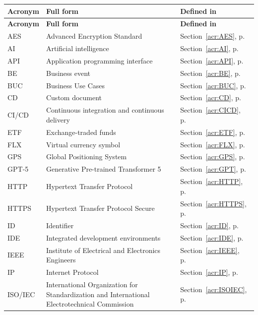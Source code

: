 \documentclass[12pt]{article}
\begin{document}
\small
\begin{xltabular}{\textwidth}{|p{1.9cm}|X|p{3.6cm}|}
\hline
\textbf{Acronym} & \textbf{Full form} & \textbf{Defined in} \\
\hline
\endfirsthead
\hline
\textbf{Acronym} & \textbf{Full form} & \textbf{Defined in} \\
\hline
\endhead
AES & Advanced Encryption Standard & Section~\ref{acr:AES}, p.~\pageref{acr:AES} \\
\hline
AI & Artificial intelligence & Section~\ref{acr:AI}, p.~\pageref{acr:AI} \\
\hline
API & Application programming interface & Section~\ref{acr:API}, p.~\pageref{acr:API} \\
\hline
BE & Business event & Section~\ref{acr:BE}, p.~\pageref{acr:BE} \\
\hline
BUC & Business Use Cases & Section~\ref{acr:BUC}, p.~\pageref{acr:BUC} \\
\hline
CD & Custom document & Section~\ref{acr:CD}, p.~\pageref{acr:CD} \\
\hline
CI/CD & Continuous integration and continuous delivery & Section~\ref{acr:CICD}, p.~\pageref{acr:CICD} \\
\hline
ETF & Exchange-traded funds & Section~\ref{acr:ETF}, p.~\pageref{acr:ETF} \\
\hline
FLX & Virtual currency symbol & Section~\ref{acr:FLX}, p.~\pageref{acr:FLX} \\
\hline
GPS & Global Positioning System & Section~\ref{acr:GPS}, p.~\pageref{acr:GPS} \\
\hline
GPT-5 & Generative Pre-trained Transformer 5 & Section~\ref{acr:GPT}, p.~\pageref{acr:GPT} \\
\hline
HTTP & Hypertext Transfer Protocol & Section~\ref{acr:HTTP}, p.~\pageref{acr:HTTP} \\
\hline
HTTPS & Hypertext Transfer Protocol Secure & Section~\ref{acr:HTTPS}, p.~\pageref{acr:HTTPS} \\
\hline
ID & Identifier & Section~\ref{acr:ID}, p.~\pageref{acr:ID} \\
\hline
IDE & Integrated development environments & Section~\ref{acr:IDE}, p.~\pageref{acr:IDE} \\
\hline
IEEE & Institute of Electrical and Electronics Engineers & Section~\ref{acr:IEEE}, p.~\pageref{acr:IEEE} \\
\hline
IP & Internet Protocol & Section~\ref{acr:IP}, p.~\pageref{acr:IP} \\
\hline
ISO/IEC & International Organization for Standardization and International Electrotechnical Commission & Section~\ref{acr:ISOIEC}, p.~\pageref{acr:ISOIEC} \\

\end{xltabular}
\end{document}
